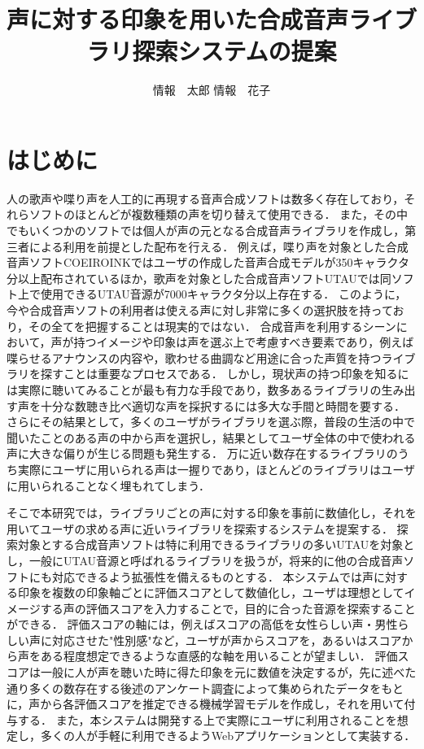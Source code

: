 \documentclass[a4j,8pt,twocolumn]{extarticle}
\title{声に対する印象を用いた合成音声ライブラリ探索システムの提案}
\author{情報　太郎 \qquad 情報　花子}
\affiliation{情報大学情報学部}
\begin{document}
\maketitle
\thispagestyle{empty}	%

\section{はじめに}

人の歌声や喋り声を人工的に再現する音声合成ソフトは数多く存在しており，それらソフトのほとんどが複数種類の声を切り替えて使用できる．
また，その中でもいくつかのソフトでは個人が声の元となる合成音声ライブラリを作成し，第三者による利用を前提とした配布を行える．
例えば，喋り声を対象とした合成音声ソフトCOEIROINKではユーザの作成した音声合成モデルが350キャラクタ分以上配布されているほか\cite{mycoeiroink}，歌声を対象とした合成音声ソフトUTAUでは同ソフト上で使用できるUTAU音源が7000キャラクタ分以上存在する\cite{vdbutau}．
このように，今や合成音声ソフトの利用者は使える声に対し非常に多くの選択肢を持っており，その全てを把握することは現実的ではない．
合成音声を利用するシーンにおいて，声が持つイメージや印象は声を選ぶ上で考慮すべき要素であり，例えば喋らせるアナウンスの内容や，歌わせる曲調など用途に合った声質を持つライブラリを探すことは重要なプロセスである．
しかし，現状声の持つ印象を知るには実際に聴いてみることが最も有力な手段であり，数多あるライブラリの生み出す声を十分な数聴き比べ適切な声を採択するには多大な手間と時間を要する．
さらにその結果として，多くのユーザがライブラリを選ぶ際，普段の生活の中で聞いたことのある声の中から声を選択し，結果としてユーザ全体の中で使われる声に大きな偏りが生じる問題も発生する．
万に近い数存在するライブラリのうち実際にユーザに用いられる声は一握りであり，ほとんどのライブラリはユーザに用いられることなく埋もれてしまう．

そこで本研究では，ライブラリごとの声に対する印象を事前に数値化し，それを用いてユーザの求める声に近いライブラリを探索するシステムを提案する．
探索対象とする合成音声ソフトは特に利用できるライブラリの多いUTAUを対象とし，一般にUTAU音源と呼ばれるライブラリを扱うが，将来的に他の合成音声ソフトにも対応できるよう拡張性を備えるものとする．
本システムでは声に対する印象を複数の印象軸ごとに評価スコアとして数値化し，ユーザは理想としてイメージする声の評価スコアを入力することで，目的に合った音源を探索することができる．
評価スコアの軸には，例えばスコアの高低を女性らしい声・男性らしい声に対応させた"性別感"など，ユーザが声からスコアを，あるいはスコアから声をある程度想定できるような直感的な軸を用いることが望ましい．
評価スコアは一般に人が声を聴いた時に得た印象を元に数値を決定するが，先に述べた通り多くの数存在する後述のアンケート調査によって集められたデータをもとに，声から各評価スコアを推定できる機械学習モデルを作成し，それを用いて付与する．
また，本システムは開発する上で実際にユーザに利用されることを想定し，多くの人が手軽に利用できるようWebアプリケーションとして実装する．
\end{document}

